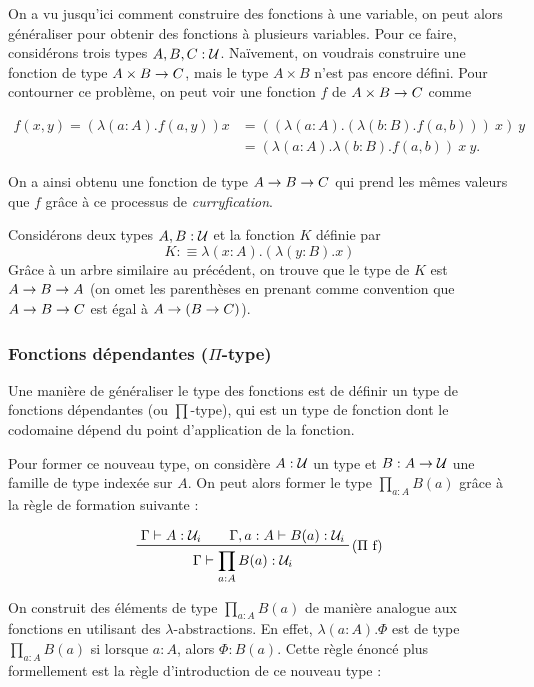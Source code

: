 \documentclass[../../rapport.tex]{subfiles}
\begin{document}
  On a vu jusqu'ici comment construire des fonctions à une variable, on peut alors généraliser pour obtenir
  des fonctions à plusieurs variables.
  Pour ce faire, considérons trois types $A, B, C : \mathcal U$.
  Naïvement, on voudrais construire une fonction de type $A \times B \rightarrow C$,
  mais le type $A \times B$ n'est pas encore défini.
  Pour contourner ce problème, on peut voir une fonction $f$ de $A \times B \rightarrow C$ comme

  \begin{align}
    f(x, y) = (\lambda(a : A). f(a, y)) x &= ((\lambda(a : A). (\lambda(b : B). f(a, b)))\ x)\ y \\ 
					  &= (\lambda(a : A).\lambda(b : B). f(a, b))\ x\ y.
  \end{align}

  On a ainsi obtenu une fonction de type $A \rightarrow B \rightarrow C$ qui prend les mêmes valeurs que $f$
  grâce à ce processus de \textit{curryfication}.

  \begin{example}
    Considérons deux types $A, B : \mathcal U$ et la fonction $K$ définie par
    $$K :\equiv \lambda(x : A).(\lambda(y : B).x)$$
    Grâce à un arbre similaire au précédent, on trouve que le type de $K$ est $A \rightarrow B \rightarrow A$
    (on omet les parenthèses en prenant comme convention que $A \rightarrow B \rightarrow C$ est égal à $A \rightarrow (B \rightarrow C)$).
  \end{example}

  \subsubsection{Fonctions dépendantes ($\Pi$-type)}

  Une manière de généraliser le type des fonctions est de définir un type de fonctions dépendantes (ou $\prod$-type),
  qui est un type de fonction dont le codomaine dépend du point d'application de la fonction.

  Pour former ce nouveau type, on considère $A : \mathcal U$ un type et $B : A \rightarrow \mathcal U$ une famille de type indexée sur $A$.
  On peut alors former le type $\prod_{a : A}{B(a)}$ grâce à la règle de formation suivante :

  $$
  \prfinterspace=2em
  \prftree[r]{($\Pi$ f)}{\Gamma \vdash A : \U_i}{\Gamma, a : A \vdash B(a) : \U_i}
    {\Gamma \vdash \prod_{a:A}{B(a)} : \U_i}
  $$

  On construit des éléments de type $\prod_{a:A}{B(a)}$ de manière analogue aux fonctions en utilisant des $\lambda$-abstractions.
  En effet, $\lambda(a : A). \Phi$ est de type $\prod_{a:A}{B(a)}$ si lorsque $a : A$, alors $\Phi : B(a)$.
  Cette règle énoncé plus formellement est la règle d'introduction de ce nouveau type :
\end{document}
